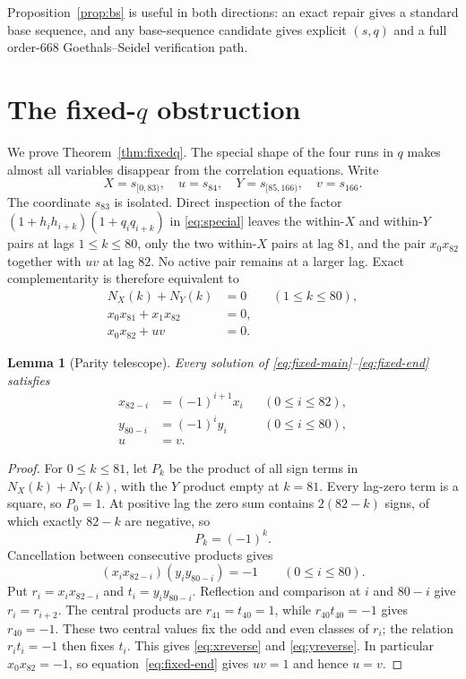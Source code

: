 \documentclass[11pt]{article}
\newtheorem{lemma}[theorem]{Lemma}
\begin{document}
Proposition~\ref{prop:bs} is useful in both directions: an exact repair gives
a standard base sequence, and any base-sequence candidate gives explicit
$(s,q)$ and a full order-$668$ Goethals--Seidel verification path.

\section{The fixed-\texorpdfstring{$q$}{q} obstruction}

We prove Theorem~\ref{thm:fixedq}.  The special shape of the four runs in
$q$ makes almost all variables disappear from the correlation equations.
Write
\[
 X=s_{[0,83)},\quad u=s_{84},\quad
 Y=s_{[85,166)},\quad v=s_{166}.
\]
The coordinate $s_{83}$ is isolated.  Direct inspection of the factor
$(1+h_ih_{i+k})(1+q_iq_{i+k})$ in
\eqref{eq:special} leaves the within-$X$ and within-$Y$ pairs at lags
$1\le k\le80$, only the two within-$X$ pairs at lag $81$, and the pair
$x_0x_{82}$ together with $uv$ at lag $82$.  No active pair remains at a
larger lag.  Exact complementarity is therefore equivalent to
\begin{align}
 N_X(k)+N_Y(k)&=0 &&(1\le k\le80),\label{eq:fixed-main}\\
 x_0x_{81}+x_1x_{82}&=0,\label{eq:fixed-81}\\
 x_0x_{82}+uv&=0.\label{eq:fixed-end}
\end{align}

\begin{lemma}[Parity telescope]\label{lem:telescope}
Every solution of \eqref{eq:fixed-main}--\eqref{eq:fixed-end} satisfies
\begin{align}
 x_{82-i}&=(-1)^{i+1}x_i &&(0\le i\le82),\label{eq:xreverse}\\
 y_{80-i}&=(-1)^iy_i &&(0\le i\le80),\label{eq:yreverse}\\
 u&=v.\label{eq:uv}
\end{align}
\end{lemma}

\begin{proof}
For $0\le k\le81$, let $P_k$ be the product of all sign terms in
$N_X(k)+N_Y(k)$, with the $Y$ product empty at $k=81$.  Every lag-zero term
is a square, so $P_0=1$.  At positive lag the zero sum contains
$2(82-k)$ signs, of which exactly $82-k$ are negative, so
\[
 P_k=(-1)^k.
\]
Cancellation between consecutive products gives
\[
 (x_ix_{82-i})(y_iy_{80-i})=-1
 \qquad(0\le i\le80).
\]
Put $r_i=x_ix_{82-i}$ and $t_i=y_iy_{80-i}$.  Reflection and comparison at
$i$ and $80-i$ give $r_i=r_{i+2}$.  The central products are
$r_{41}=t_{40}=1$, while $r_{40}t_{40}=-1$ gives $r_{40}=-1$.
These two central values fix the odd and even classes of $r_i$; the relation
$r_it_i=-1$ then fixes $t_i$.  This gives \eqref{eq:xreverse} and
\eqref{eq:yreverse}.  In particular $x_0x_{82}=-1$, so
equation~\eqref{eq:fixed-end} gives $uv=1$ and hence $u=v$.
\end{proof}
\end{document}
